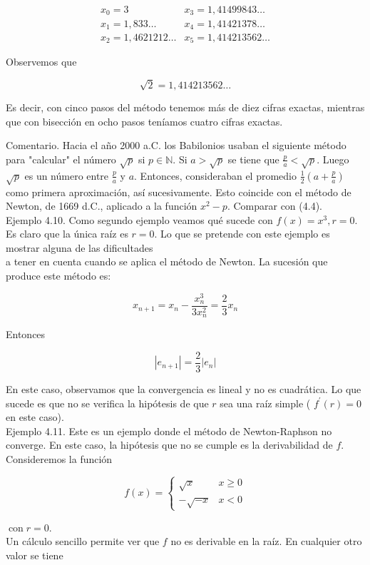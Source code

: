 \documentclass[10pt]{book}
\begin{document}
$$
\begin{array}{ll}
x_{0}=3 & x_{3}=1,41499843 \ldots \\
x_{1}=1,833 \ldots & x_{4}=1,41421378 \ldots \\
x_{2}=1,4621212 \ldots & x_{5}=1,414213562 \ldots
\end{array}
$$

Observemos que

$$
\sqrt{2}=1,414213562 \ldots
$$

Es decir, con cinco pasos del método tenemos más de diez cifras exactas, mientras que con bisección en ocho pasos teníamos cuatro cifras exactas.

Comentario. Hacia el año 2000 a.C. los Babilonios usaban el siguiente método para "calcular" el número $\sqrt{p}$ si $p \in \mathbb{N}$. Si $a>\sqrt{p}$ se tiene que $\frac{p}{a}<\sqrt{p}$. Luego $\sqrt{p}$ es un número entre $\frac{p}{a}$ y $a$. Entonces, consideraban el promedio $\frac{1}{2}\left(a+\frac{p}{a}\right)$ como primera aproximación, así sucesivamente. Esto coincide con el método de Newton, de 1669 d.C., aplicado a la función $x^{2}-p$. Comparar con (4.4).\\
Ejemplo 4.10. Como segundo ejemplo veamos qué sucede con $f(x)=x^{3}, r=0$. Es claro que la única raíz es $r=0$. Lo que se pretende con este ejemplo es mostrar alguna de las dificultades\\
a tener en cuenta cuando se aplica el método de Newton. La sucesión que produce este método es:

$$
x_{n+1}=x_{n}-\frac{x_{n}^{3}}{3 x_{n}^{2}}=\frac{2}{3} x_{n}
$$

Entonces

$$
\left|e_{n+1}\right|=\frac{2}{3}\left|e_{n}\right|
$$

En este caso, observamos que la convergencia es lineal y no es cuadrática. Lo que sucede es que no se verifica la hipótesis de que $r$ sea una raíz simple ( $f^{\prime}(r)=0$ en este caso).\\
Ejemplo 4.11. Este es un ejemplo donde el método de Newton-Raphson no converge. En este caso, la hipótesis que no se cumple es la derivabilidad de $f$. Consideremos la función

$$
f(x)= \begin{cases}\sqrt{x} & x \geq 0 \\ -\sqrt{-x} & x<0\end{cases}
$$

$\operatorname{con} r=0$.\\
Un cálculo sencillo permite ver que $f$ no es derivable en la raíz. En cualquier otro valor se tiene
\end{document}
